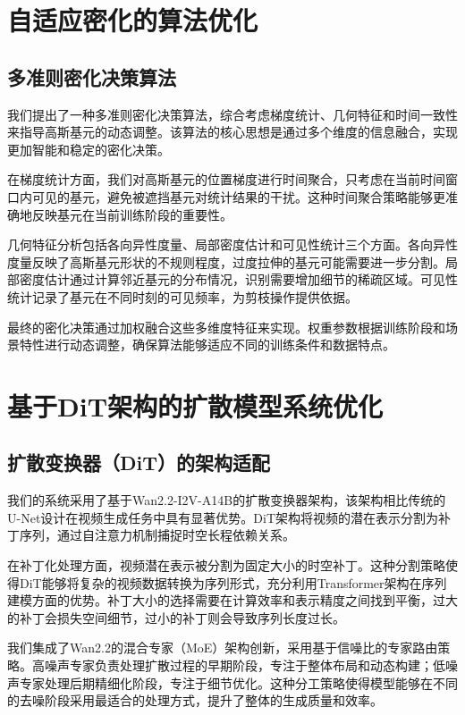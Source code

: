 \section{自适应密化的算法优化}

\subsection{多准则密化决策算法}

我们提出了一种多准则密化决策算法，综合考虑梯度统计、几何特征和时间一致性来指导高斯基元的动态调整。该算法的核心思想是通过多个维度的信息融合，实现更加智能和稳定的密化决策。

在梯度统计方面，我们对高斯基元的位置梯度进行时间聚合，只考虑在当前时间窗口内可见的基元，避免被遮挡基元对统计结果的干扰。这种时间聚合策略能够更准确地反映基元在当前训练阶段的重要性。

几何特征分析包括各向异性度量、局部密度估计和可见性统计三个方面。各向异性度量反映了高斯基元形状的不规则程度，过度拉伸的基元可能需要进一步分割。局部密度估计通过计算邻近基元的分布情况，识别需要增加细节的稀疏区域。可见性统计记录了基元在不同时刻的可见频率，为剪枝操作提供依据。

最终的密化决策通过加权融合这些多维度特征来实现。权重参数根据训练阶段和场景特性进行动态调整，确保算法能够适应不同的训练条件和数据特点。

\section{基于DiT架构的扩散模型系统优化}

\subsection{扩散变换器（DiT）的架构适配}

我们的系统采用了基于Wan2.2-I2V-A14B的扩散变换器架构，该架构相比传统的U-Net设计在视频生成任务中具有显著优势。DiT架构将视频的潜在表示分割为补丁序列，通过自注意力机制捕捉时空长程依赖关系。

在补丁化处理方面，视频潜在表示被分割为固定大小的时空补丁。这种分割策略使得DiT能够将复杂的视频数据转换为序列形式，充分利用Transformer架构在序列建模方面的优势。补丁大小的选择需要在计算效率和表示精度之间找到平衡，过大的补丁会损失空间细节，过小的补丁则会导致序列长度过长。

我们集成了Wan2.2的混合专家（MoE）架构创新，采用基于信噪比的专家路由策略。高噪声专家负责处理扩散过程的早期阶段，专注于整体布局和动态构建；低噪声专家处理后期精细化阶段，专注于细节优化。这种分工策略使得模型能够在不同的去噪阶段采用最适合的处理方式，提升了整体的生成质量和效率。

